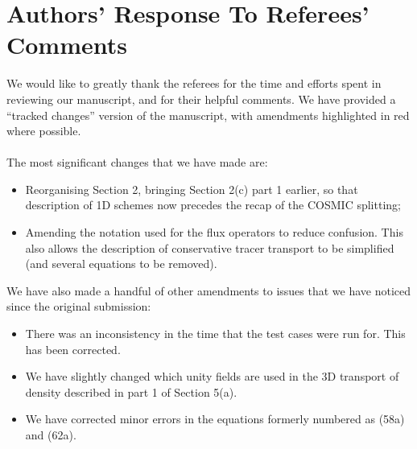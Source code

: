 \documentclass[11pt,a4paper]{article}
\begin{document}
\section*{Authors' Response To Referees' Comments}
We would like to greatly thank the referees for the time and efforts spent in reviewing our manuscript, and for their helpful comments.
We have provided a ``tracked changes'' version of the manuscript, with amendments highlighted in red where possible.
\\
\\
The most significant changes that we have made are:
\begin{itemize}[leftmargin=*]
\item Reorganising Section 2, bringing Section 2(c) part 1 earlier, so that description of 1D schemes now precedes the recap of the COSMIC splitting;
\item Amending the notation used for the flux operators to reduce confusion. This also allows the description of conservative tracer transport to be simplified (and several equations to be removed).
\end{itemize}
We have also made a handful of other amendments to issues that we have noticed since the original submission:
\begin{itemize}
    \item There was an inconsistency in the time that the test cases were run for. This has been corrected.
    \item We have slightly changed which unity fields are used in the 3D transport of density described in part 1 of Section 5(a).
    \item We have corrected minor errors in the equations formerly numbered as (58a) and (62a).
\end{itemize}
\end{document}
